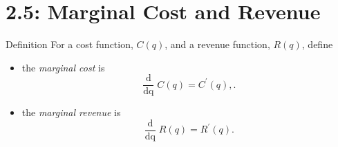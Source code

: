 \documentclass[Lecture.tex]{subfiles}
\begin{document}
\section{2.5: Marginal Cost and Revenue}

\begin{frame}{Definition}
  For a cost function, $C(q)$, and a revenue function, $R(q)$, define
  \begin{itemize}
  \item<2->
    the {\it marginal cost} is
    $$\frac{\operatorname{d}}{\operatorname{dq}}C(q) = C^\prime(q),.$$
  \item<3->
    the {\it marginal revenue} is
    $$\frac{\operatorname{d}}{\operatorname{dq}}R(q) = R^\prime(q).$$
  \end{itemize}
\end{frame}
\end{document}
